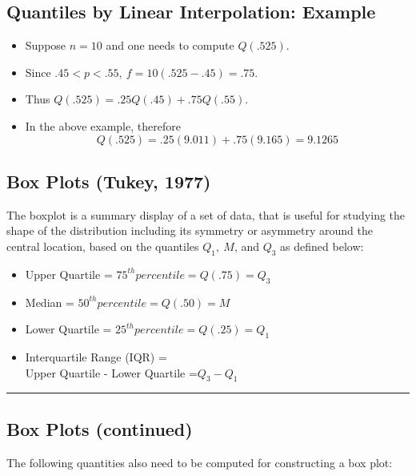 \documentclass[
  letterpaper,
  DIV=11,
  numbers=noendperiod]{scrartcl}
\begin{document}
\subsection{Quantiles by Linear Interpolation:
Example}\label{quantiles-by-linear-interpolation-example}

\begin{itemize}
\item
  Suppose \(n = 10\) and one needs to compute \(Q(.525)\).
\item
  Since \(.45 < p < .55, \ f = 10 (.525 - .45)  = .75\).
\item
  Thus \(Q(.525)=.25Q(.45) +
  .75Q(.55)\).
\item
  In the above example, therefore
  \[Q(.525)= .25(9.011)+.75(9.165)=9.1265\]
\end{itemize}

\subsection{Box Plots (Tukey, 1977)}\label{box-plots-tukey-1977}

The boxplot is a summary display of a set of data, that is useful for
studying the shape of the distribution including its symmetry or
asymmetry around the central location, based on the quantiles
\(Q_1,\ M\), and \(Q_3\) as defined below:

\begin{itemize}
\item
  Upper Quartile = \(75^{ th} { percentile} =Q(.75)=Q_3\)
\item
  Median = \(50^{ th} { percentile} =Q(.50)=M\)
\item
  Lower Quartile = \(25^{ th} {percentile} =Q(.25)= Q_1\)
\item
  Interquartile Range (IQR) =\\
  Upper Quartile - Lower Quartile =\(Q_3- Q_1\)
\end{itemize}

\begin{center}\rule{0.5\linewidth}{0.5pt}\end{center}

\subsection{Box Plots (continued)}\label{box-plots-continued}

The following quantities also need to be computed for constructing a box
plot:
\end{document}
